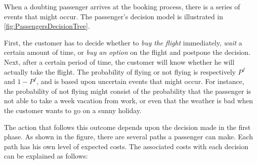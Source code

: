 When a doubting passenger arrives at the booking process, there is a series of events that might occur. The passenger's decision model is illustrated in \autoref{fig:PassengersDecisionTree}.


First, the customer has to decide whether to \emph{buy the flight} immediately, \emph{wait} a certain amount of time, or \emph{buy an option} on the flight and postpone the decision. Next, after a certain period of time, the customer will know whether he will actually take the flight. The probability of flying or not flying is respectively $P^f$ and $1 - P^f$, and is based upon uncertain events that might occur. For instance, the probability of not flying might consist of the probability that the passenger is not able to take a week vacation from work, or even that the weather is bad when the customer wants to go on a sunny holiday.

The action that follows this outcome depends upon the decision made in the first phase. As shown in the figure, there are several paths a passenger can make. Each path has his own level of expected costs. The associated costs with each decision can be explained as follows:

